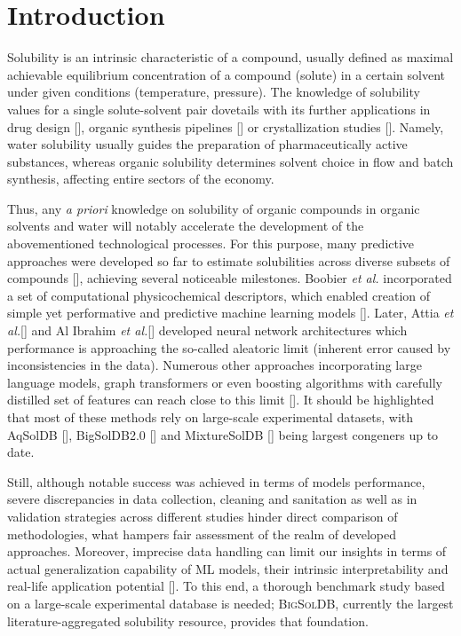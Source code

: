 \section{Introduction}
\label{sec:introduction}

Solubility is an intrinsic characteristic of a compound, usually defined as maximal achievable equilibrium concentration of a compound (solute) in a certain solvent under given conditions (temperature, pressure). The knowledge of solubility values for a single solute-solvent pair dovetails with its further applications in drug design [\cite{ma2025solecos,bolla2022crystals}], organic synthesis pipelines [\cite{reichardt2011solvents,diorazio2016toward,tu2025askcos}] or crystallization studies [\cite{sheikholeslamzadeh2012optimal,mendis2022simultaneous}]. Namely, water solubility usually guides the preparation of pharmaceutically active substances, whereas organic solubility determines solvent choice in flow and batch synthesis, affecting entire sectors of the economy.

Thus, any \textit{a priori} knowledge on solubility of organic compounds in organic solvents and water will notably accelerate the development of the abovementioned technological processes. For this purpose, many predictive approaches were developed so far to estimate solubilities across diverse subsets of compounds [\cite{fowles2025physics}], achieving several noticeable milestones. Boobier \textit{et al.} incorporated a set of computational physicochemical descriptors, which enabled creation of simple yet performative and predictive machine learning models [\cite{boobier2020machine}]. Later, Attia \textit{et al.}[\cite{attia2025data}] and Al Ibrahim \textit{et al.}[\cite{al2025accurately}] developed neural network architectures which performance is approaching the so-called aleatoric limit (inherent error caused by inconsistencies in the data). Numerous other approaches incorporating large language models, graph transformers or even boosting algorithms with carefully distilled set of features can reach close to this limit [\cite{jung2025enhancing,broadbent2025solvaformer,ramani2026dissolvr}]. It should be highlighted that most of these methods rely on large-scale experimental datasets, with AqSolDB [\cite{sorkun2019aqsoldb}], BigSolDB2.0 [\cite{krasnov2025bigsoldb}] and MixtureSolDB  [\cite{malikov2026dataset}] being largest congeners up to date.

Still, although notable success was achieved in terms of models performance, severe discrepancies in data collection, cleaning and sanitation as well as in validation strategies across different studies hinder direct comparison of methodologies, what hampers fair assessment of the realm of developed approaches. Moreover, imprecise data handling can limit our insights in terms of actual generalization capability of ML models, their intrinsic interpretability and real-life application potential [\cite{llompart2024curation}]. To this end, a thorough benchmark study based on a large-scale experimental database is needed; \textsc{BigSolDB}, currently the largest literature-aggregated solubility resource, provides that foundation.

